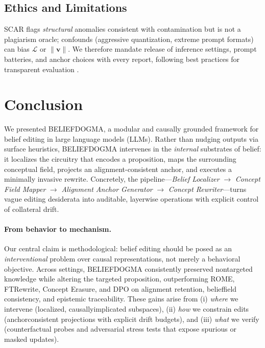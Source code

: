 \documentclass[11pt]{article}
\begin{document}
\subsection*{Ethics and Limitations}
\label{subsec:ethics}
SCAR flags \emph{structural} anomalies consistent with contamination but is not a plagiarism oracle; confounds (aggressive quantization, extreme prompt formats) can bias $\mathcal{L}$ or $\|\mathbf{v}\|$. We therefore mandate release of inference settings, prompt batteries, and anchor choices with every report, following best practices for transparent evaluation \citep{dodge2021documenting,ribeiro2020checklist}.



% 
% 
% 


% 


\section{Conclusion}
\vspace{-2mm}

We presented \textsc{BELIEF\textendash DOGMA}, a modular and causally grounded framework for belief editing in large language models (LLMs). Rather than nudging outputs via surface heuristics, \textsc{BELIEF\textendash DOGMA} intervenes in the \emph{internal} substrates of belief: it localizes the circuitry that encodes a proposition, maps the surrounding conceptual field, projects an alignment-consistent anchor, and executes a minimally invasive rewrite. Concretely, the pipeline---\emph{Belief Localizer} $\rightarrow$ \emph{Concept Field Mapper} $\rightarrow$ \emph{Alignment Anchor Generator} $\rightarrow$ \emph{Concept Rewriter}---turns vague editing desiderata into auditable, layerwise operations with explicit control of collateral drift. 

\paragraph{From behavior to mechanism.}
Our central claim is methodological: belief editing should be posed as an \emph{interventional} problem over causal representations, not merely a behavioral objective. Across settings, \textsc{BELIEF\textendash DOGMA} consistently preserved non\textendash targeted knowledge while altering the targeted proposition, outperforming ROME, FT\textendash Rewrite, Concept Erasure, and DPO on alignment retention, belief\textendash field consistency, and epistemic traceability. These gains arise from (i) \emph{where} we intervene (localized, causally\textendash implicated subspaces), (ii) \emph{how} we constrain edits (anchor\textendash consistent projections with explicit drift budgets), and (iii) \emph{what} we verify (counterfactual probes and adversarial stress tests that expose spurious or masked updates).
\end{document}
